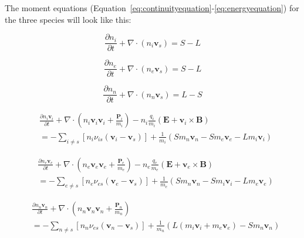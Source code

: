 \documentclass[12pt,upcase]{umlthesis}
\begin{document}
The moment equations (Equation~\ref{eq:continuityequation}-\ref{eq:energyequation}) for the three species will look like this:

\begin{equation}\label{eq:icontinuity}
	\frac{\partial n_i}{\partial t} + \nabla \cdot (n_i \textbf{v}_s) = S - L
\end{equation}

\begin{equation}\label{eq:econtinuity}
	\frac{\partial n_e}{\partial t} + \nabla \cdot (n_e \textbf{v}_s) = S - L
\end{equation}

\begin{equation}\label{eq:ncontinuity}
	\frac{\partial n_n}{\partial t} + \nabla \cdot (n_n \textbf{v}_s) = L - S
\end{equation}

\begin{equation}\label{eq:imomentum}
	\begin{aligned}
	& \frac{\partial n_i \textbf{v}_i}{\partial t} + \nabla \cdot (n_i \textbf{v}_i \textbf{v}_i + \frac{\textbf{P}_i}{m_i} ) - n_i \frac{q_i}{m_i}(\textbf{E} + \textbf{v}_i \times \textbf{B}) \\
	& = - \sum_{i \neq s} [n_i \nu_{is}(\textbf{v}_i - \textbf{v}_s)] + \frac{1}{m_i} (S m_n \textbf{v}_n - S m_e \textbf{v}_e -L m_i \textbf{v}_i)
\end{aligned}
\end{equation}

\begin{equation}\label{eq:emomentum}
	\begin{aligned}
	& \frac{\partial n_e \textbf{v}_e}{\partial t} + \nabla \cdot (n_e \textbf{v}_e \textbf{v}_e + \frac{\textbf{P}_e}{m_e} ) - n_e \frac{q_e}{m_e}(\textbf{E} + \textbf{v}_e \times \textbf{B}) \\
	& = - \sum_{e \neq s} [n_e \nu_{es}(\textbf{v}_e - \textbf{v}_s)] + \frac{1}{m_e} (S m_n \textbf{v}_n - S m_i \textbf{v}_i - L m_e \textbf{v}_e)
\end{aligned}
\end{equation}

\begin{equation}\label{eq:nmomentum}
	\begin{aligned}
	& \frac{\partial n_n \textbf{v}_n}{\partial t} + \nabla \cdot (n_n \textbf{v}_n \textbf{v}_n + \frac{\textbf{P}_n}{m_n} ) \\
	& = - \sum_{n \neq s} [n_n \nu_{es}(\textbf{v}_n - \textbf{v}_s)] + \frac{1}{m_n} (L(m_i\textbf{v}_i+m_e\textbf{v}_e) -S m_n \textbf{v}_n)
\end{aligned}
\end{equation}
\end{document}
